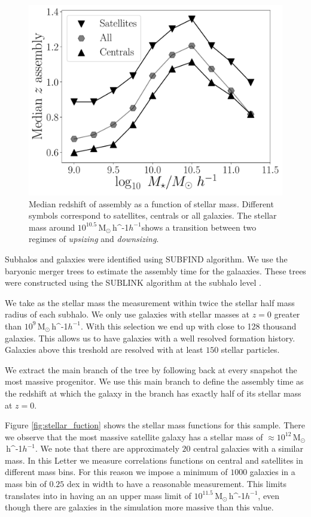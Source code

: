 \documentclass[fleqn,usenatbib]{mnras}
\newcommand{\Msunh}{\,{\rm M}$_{\odot}$\,\ifmmode h^{-1}\else $h^{-1}$\fi}
\begin{document}
\begin{figure}
    \centering
    \includegraphics[width=1\columnwidth]{figuras/median_assembly.pdf}
    \caption{Median redshift of assembly as a function of stellar mass.
    Different symbols correspond to satellites, centrals or all galaxies.
    The stellar mass around $10^{10.5}$\Msunh shows a transition between two 
    regimes of \emph{upsizing} and \emph{downsizing}.}
    \label{fig:median_assembly}
\end{figure}


Subhalos and galaxies were identified using SUBFIND algorithm.
We use the baryonic merger trees to estimate the assembly time for the
galaaxies.
These trees were constructed using the SUBLINK algorithm at the
subhalo level \citep{2015MNRAS.449...49R}.

We take as the stellar mass the measurement within
twice the stellar half mass radius of each subhalo.
We only use galaxies with stellar masses at $z=0$ greater than
$10^{9}$\Msunh.
With this selection we end up with close to 128 thousand galaxies.
This allows us to have galaxies with a well resolved formation
history. 
Galaxies above this treshold are resolved with at least $150$ stellar
particles. 

We extract the main branch of the tree by following back at every
snapshot the most massive progenitor.
We use this main branch to define the assembly time as the redshift
at which the galaxy in the branch has exactly half of its stellar mass
at $z=0$.   


Figure \ref{fig:stellar_fuction} shows the stellar mass functions for
this sample.
There we observe that the most massive satellite galaxy has a stellar
mass of $\approx 10^{12}$\Msunh.    
We note that there are approximately $20$ central galaxies
with a similar mass.
In this Letter we measure correlations functions on central and
satellites in different mass bins.
For this reason we impose a  minimum of $1000$ galaxies
in a mass bin of $0.25$ dex in width to have a reasonable
measurement. 
This limits translates into in having an an upper mass limit of
$10^{11.5}$\Msunh, even though there are galaxies in the simulation
more massive than this value.
\end{document}
